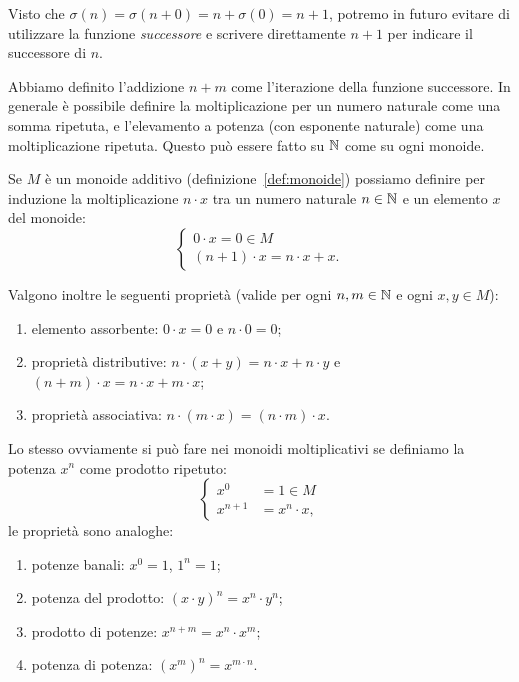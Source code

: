 %
Visto che $\sigma(n) = \sigma(n+0) = n+\sigma(0) = n+1$, 
potremo in futuro evitare di utilizzare la funzione \emph{successore} 
e scrivere direttamente $n+1$ per indicare il successore di $n$.

Abbiamo definito l'addizione $n+m$ 
come l'iterazione della funzione successore.
In generale è possibile definire la moltiplicazione per un numero naturale 
come una somma ripetuta, e l'elevamento a potenza (con esponente naturale)
come una moltiplicazione ripetuta.
Questo può essere fatto su ${\mathbb N}$ come su ogni monoide.

\begin{theorem}
\label{th:operazioni_iterate}%
\label{th:operazione_ripetuta}%
Se $M$ è un monoide additivo (definizione~\ref{def:monoide})
possiamo definire per induzione la moltiplicazione $n\cdot x$ tra un numero 
naturale $n\in {\mathbb N}$ e un elemento $x$ del monoide:
\[
\begin{cases}
  0\cdot x = 0 \in M \\
  (n+1)\cdot x = n\cdot x + x.
\end{cases}
\]

Valgono inoltre le seguenti proprietà
(valide per ogni $n,m\in {\mathbb N}$ e ogni $x,y\in M$):
\begin{enumerate}
  \item elemento assorbente: $0\cdot x = 0$ e $n\cdot 0 = 0$;
  \item proprietà distributive: 
    $n\cdot (x+y)=n\cdot x + n\cdot y$
    e $(n+m)\cdot x = n\cdot x + m\cdot x$;
  \item proprietà associativa: $n\cdot (m\cdot x)= (n\cdot m)\cdot x$.
\end{enumerate}

Lo stesso ovviamente si può fare nei monoidi moltiplicativi
se definiamo la potenza $x^n$ come prodotto ripetuto:
\[
\begin{cases}
  x^0 &= 1 \in M \\
  x^{n+1} &= x^n \cdot x,
\end{cases}
\]
le proprietà sono analoghe:
\begin{enumerate}
  \item potenze banali: $x^0=1$, $1^n=1$;
  \item potenza del prodotto: $(x\cdot y)^n = x^n\cdot y^n$;
  \item prodotto di potenze: $x^{n+m}=x^n\cdot x^m$;
  \item potenza di potenza: $(x^m)^n = x^{m\cdot n}$.
\end{enumerate}
\end{theorem}
